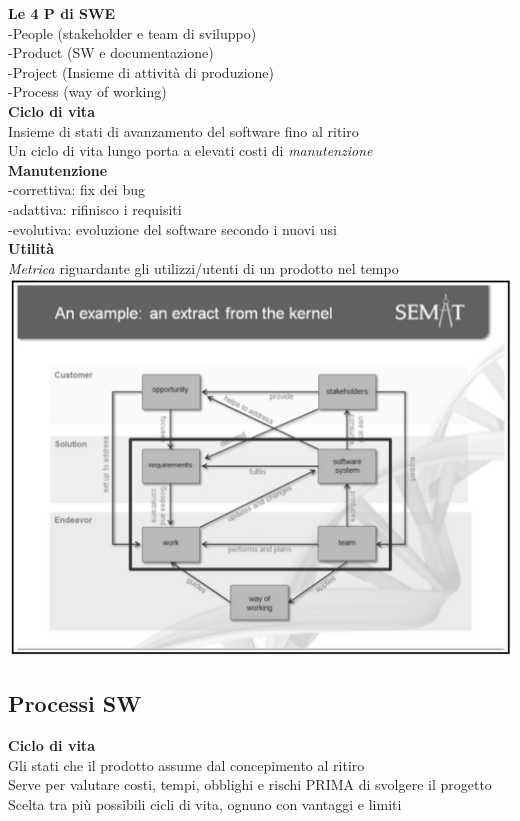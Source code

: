\documentclass{article}
\begin{document}
		\textbf{Le 4 P di SWE}\\
		-People (stakeholder e team di sviluppo)\\
		-Product (SW e documentazione)\\
		-Project (Insieme di attività di produzione)\\
		-Process (way of working)\\
		
		\textbf{Ciclo di vita}\\
		Insieme di stati di avanzamento del software fino al ritiro\\
		Un ciclo di vita lungo porta a elevati costi di \textit{manutenzione}\\
		
		\textbf{Manutenzione}\\
		-correttiva: fix dei bug\\
		-adattiva: rifinisco i requisiti\\
		-evolutiva: evoluzione del software secondo i nuovi usi\\
		
		\textbf{Utilità}\\
		\textit{Metrica} riguardante gli utilizzi/utenti di un prodotto nel tempo\\
		
		\includegraphics[width=14cm]{semat_org.jpg}\\
		
		
	\clearpage
	\subsection{Processi SW}
		\textbf{Ciclo di vita}\\
		Gli stati che il prodotto assume dal concepimento al ritiro\\
		Serve per valutare costi, tempi, obblighi e rischi PRIMA di svolgere il progetto\\
		Scelta tra più possibili cicli di vita, ognuno con vantaggi e limiti\\
		
\end{document}
